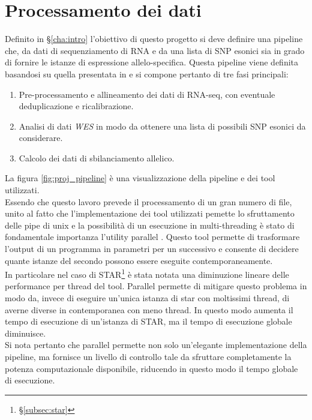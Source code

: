 \graphicspath{{chapters/03/media/}}
\chapter{Processamento dei dati}
\label{cha:processamento}
Definito in \S\ref{cha:intro} l'obiettivo di questo progetto si deve definire una pipeline che, da dati di sequenziamento di RNA e da una lista di SNP esonici  sia in grado di fornire le istanze di espressione allelo-specifica.
Questa pipeline viene definita basandosi su quella presentata in \cite{ase_pipeline} e si compone pertanto di tre fasi principali:
\begin{enumerate}
	\item Pre-processamento e allineamento dei dati di RNA-seq, con eventuale deduplicazione e ricalibrazione.
	\item Analisi di dati \emph{WES} in modo da ottenere una lista di possibili SNP esonici da considerare.
	\item Calcolo dei dati di sbilanciamento allelico.
\end{enumerate}
La figura \ref{fig:proj_pipeline} \`e una visualizzazione della pipeline e dei tool utilizzati.\\
Essendo che questo lavoro prevede il processamento di un gran numero di file, unito al fatto che l'implementazione dei tool utilizzati pemette lo sfruttamento delle pipe di unix e la possibilit\`a di un esecuzione in multi-threading \`e stato di fondamentale importanza l'utility parallel \cite{parallel}.
Questo tool permette di trasformare l'output di un programma in parametri per un successivo e consente di decidere quante istanze del secondo possono essere eseguite contemporaneamente.\\
In particolare nel caso di STAR\footnote{\S\ref{subsec:star}} \`e stata notata una diminuzione lineare delle performance per thread del tool.
Parallel permette di mitigare questo problema in modo da, invece di eseguire un'unica istanza di star con moltissimi thread, di averne diverse in contemporanea con meno thread.
In questo modo aumenta il tempo di esecuzione di un'istanza di STAR, ma il tempo di esecuzione globale diminuisce.\\
Si nota pertanto che parallel permette non solo un'elegante implementazione della pipeline, ma fornisce un livello di controllo tale da sfruttare completamente la potenza computazionale disponibile, riducendo in questo modo il tempo globale di esecuzione.

